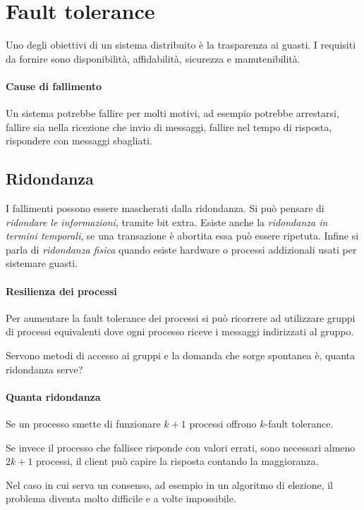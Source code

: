 \section{Fault tolerance}
Uno degli obiettivi di un sistema distribuito è
la trasparenza ai guasti. I requisiti da fornire sono 
disponibilità, affidabilità, sicurezza e manutenibilità.

\paragraph{Cause di fallimento}
Un sistema potrebbe fallire per molti motivi, ad esempio
potrebbe arrestarsi, fallire sia nella ricezione che invio 
di messaggi, fallire nel tempo di risposta, rispondere 
con messaggi sbagliati.

\subsection{Ridondanza}
I fallimenti possono essere mascherati dalla ridondanza.
Si può pensare di \emph{ridondare le informazioni}, 
tramite bit extra. Esiste anche la \emph{ridondanza in termini 
temporali}, se una transazione è abortita essa può essere 
ripetuta. Infine si parla di \emph{ridondanza fisica} quando 
esiste hardware o processi addizionali usati per sistemare
guasti.

\paragraph{Resilienza dei processi}
Per aumentare la fault tolerance dei processi 
si può ricorrere ad utilizzare gruppi di processi 
equivalenti dove ogni processo riceve i messaggi indirizzati al gruppo.

Servono metodi di accesso ai gruppi e la domanda che 
sorge spontanea è, quanta ridondanza serve?

\paragraph{Quanta ridondanza}
Se un processo smette di funzionare $k + 1$ processi 
offrono $k$-fault tolerance.

Se invece il processo che fallisce risponde con valori 
errati, sono necessari almeno $2k +1$ processi, il client può 
capire la risposta contando la maggioranza.

Nel caso in cui serva un consenso, ad esempio in un algoritmo 
di elezione, il problema diventa molto difficile e a volte 
impossibile.

